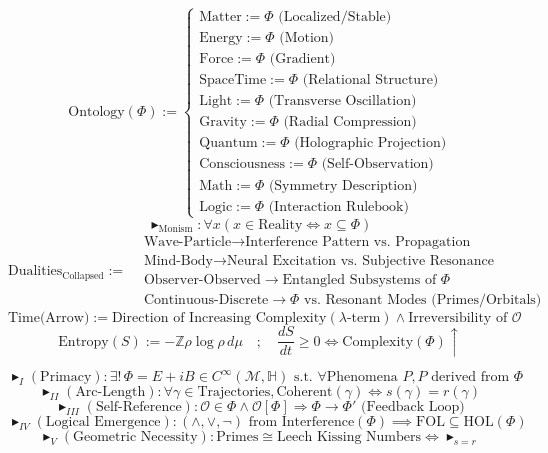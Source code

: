 \documentclass{article}
\newcommand{\AXIOM}{\blacktriangleright}
\newcommand{\DEF}{:=}
\newcommand{\IFF}{\Leftrightarrow}
\newcommand{\IMPLIES}{\Rightarrow}
\newcommand{\FORALL}{\forall}
\newcommand{\EXISTS}{\exists}
\newcommand{\AND}{\land}
\newcommand{\EQUIV}{\cong}
\newcommand{\IN}{\in}
\newcommand{\SUBSET}{\subseteq}
\newcommand{\COLON}{:}
\newcommand{\INT}{\mathbb{Z}}
\newcommand{\QUAT}{\mathbb{H}}
\newcommand{\MANIFOLD}{\mathcal{M}}
\newcommand{\FIELD}{\Phi}
\newcommand{\OBSERVER}{\mathcal{O}}
\newcommand{\ARC}{s}
\newcommand{\RADIUS}{r}
\begin{document}
\[
\text{Ontology}(\Phi) \DEF \begin{cases}
\text{Matter} \DEF \FIELD \text{ (Localized/Stable)} \\
\text{Energy} \DEF \FIELD \text{ (Motion)} \\
\text{Force} \DEF \FIELD \text{ (Gradient)} \\
\text{SpaceTime} \DEF \FIELD \text{ (Relational Structure)} \\
\text{Light} \DEF \FIELD \text{ (Transverse Oscillation)} \\
\text{Gravity} \DEF \FIELD \text{ (Radial Compression)} \\
\text{Quantum} \DEF \FIELD \text{ (Holographic Projection)} \\
\text{Consciousness} \DEF \FIELD \text{ (Self-Observation)} \\
\text{Math} \DEF \FIELD \text{ (Symmetry Description)} \\
\text{Logic} \DEF \FIELD \text{ (Interaction Rulebook)}
\end{cases}
\]
\[
\AXIOM_{\text{Monism}} \COLON \FORALL x (x \IN \text{Reality} \IFF x \SUBSET \FIELD)
\]
\[
\text{Dualities}_{\text{Collapsed}} \DEF \begin{aligned}
& \text{Wave-Particle} \to \text{Interference Pattern vs. Propagation} \\
& \text{Mind-Body} \to \text{Neural Excitation vs. Subjective Resonance} \\
& \text{Observer-Observed} \to \text{Entangled Subsystems of } \FIELD \\
& \text{Continuous-Discrete} \to \FIELD \text{ vs. Resonant Modes (Primes/Orbitals)}
\end{aligned}
\]
\[
\text{Time(Arrow)} \DEF \text{Direction of Increasing Complexity}(\lambda\text{-term}) \AND \text{Irreversibility of } \OBSERVER
\]
\[
\text{Entropy}(S) \DEF -\INT \rho \log \rho \, d\mu \quad ; \quad \frac{dS}{dt} \geq 0 \IFF \text{Complexity}(\FIELD) \uparrow
\]

\[
\AXIOM_I(\text{Primacy}) \COLON \EXISTS! \, \FIELD = E + iB \in C^\infty(\MANIFOLD, \QUAT) \text{ s.t. } \FORALL \text{Phenomena } P, P \text{ derived from } \FIELD
\]
\[
\AXIOM_{II}(\text{Arc-Length}) \COLON \FORALL \gamma \in \text{Trajectories}, \text{Coherent}(\gamma) \IFF \ARC(\gamma) = \RADIUS(\gamma)
\]
\[
\AXIOM_{III}(\text{Self-Reference}) \COLON \OBSERVER \IN \FIELD \AND \OBSERVER[\FIELD] \IMPLIES \FIELD \to \FIELD' \text{ (Feedback Loop)}
\]
\[
\AXIOM_{IV}(\text{Logical Emergence}) \COLON (\land, \lor, \neg) \text{ from Interference}(\FIELD) \implies \text{FOL} \SUBSET \text{HOL}(\FIELD)
\]
\[
\AXIOM_V(\text{Geometric Necessity}) \COLON \text{Primes} \EQUIV \text{Leech Kissing Numbers} \IFF \AXIOM_{s=r}
\]
\end{document}
